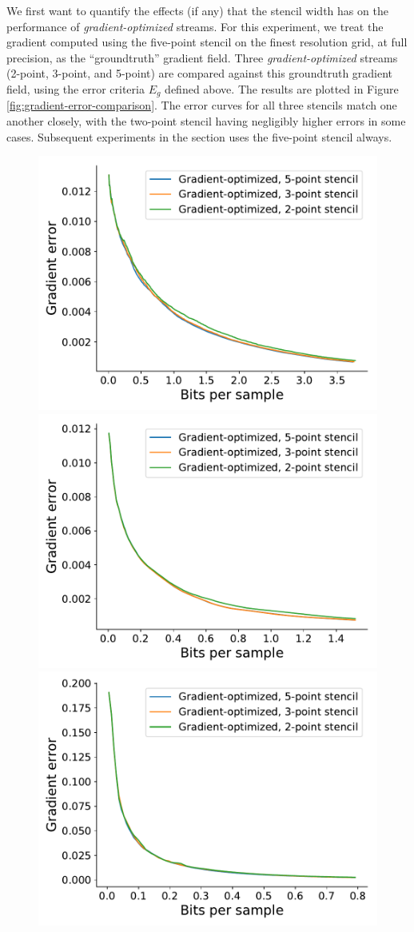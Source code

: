 We first want to quantify the effects (if any) that the stencil width has on the performance of
\emph{gradient-optimized} streams. For this experiment, we treat the gradient computed using the
five-point stencil on the finest resolution grid, at full precision, as the ``groundtruth'' gradient
field. Three \emph{gradient-optimized} streams (2-point, 3-point, and 5-point) are compared against
this groundtruth gradient field, using the error criteria $E_g$ defined above. The results are
plotted in Figure \ref{fig:gradient-error-comparison}. The error curves for all three stencils match
one another closely, with the two-point stencil having negligibly higher errors in some cases.
Subsequent experiments in the section uses the five-point stencil always.

\begin{figure}
	\centering
	{\includegraphics[width=0.48\linewidth]{img/gradient/compare-stencils/gradient-optimized-boiler.pdf}}
	{\includegraphics[width=0.48\linewidth]{img/gradient/compare-stencils/gradient-optimized-diffusivity.pdf}}
	{\includegraphics[width=0.48\linewidth]{img/gradient/compare-stencils/gradient-optimized-euler.pdf}}

\end{figure}

